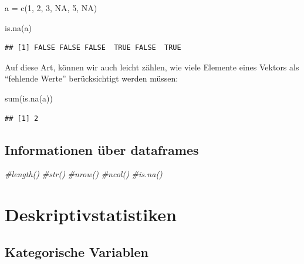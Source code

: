 \documentclass[
]{book}
\newenvironment{Shaded}{\begin{snugshade}}{\end{snugshade}}
\newcommand{\CommentTok}[1]{\textcolor[rgb]{0.56,0.35,0.01}{\textit{#1}}}
\newcommand{\ConstantTok}[1]{\textcolor[rgb]{0.00,0.00,0.00}{#1}}
\newcommand{\DecValTok}[1]{\textcolor[rgb]{0.00,0.00,0.81}{#1}}
\newcommand{\FunctionTok}[1]{\textcolor[rgb]{0.00,0.00,0.00}{#1}}
\newcommand{\NormalTok}[1]{#1}
\newcommand{\OtherTok}[1]{\textcolor[rgb]{0.56,0.35,0.01}{#1}}
\begin{document}
\begin{Shaded}
\begin{Highlighting}[]
\NormalTok{a }\OtherTok{=} \FunctionTok{c}\NormalTok{(}\DecValTok{1}\NormalTok{, }\DecValTok{2}\NormalTok{, }\DecValTok{3}\NormalTok{, }\ConstantTok{NA}\NormalTok{, }\DecValTok{5}\NormalTok{, }\ConstantTok{NA}\NormalTok{)}

\FunctionTok{is.na}\NormalTok{(a)}
\end{Highlighting}
\end{Shaded}

\begin{verbatim}
## [1] FALSE FALSE FALSE  TRUE FALSE  TRUE
\end{verbatim}

Auf diese Art, können wir auch leicht zählen, wie viele Elemente eines Vektors als ``fehlende Werte'' berücksichtigt werden müssen:

\begin{Shaded}
\begin{Highlighting}[]
\FunctionTok{sum}\NormalTok{(}\FunctionTok{is.na}\NormalTok{(a))}
\end{Highlighting}
\end{Shaded}

\begin{verbatim}
## [1] 2
\end{verbatim}

\hypertarget{informationen-uxfcber-dataframes}{%
\subsection{Informationen über dataframes}\label{informationen-uxfcber-dataframes}}

\begin{Shaded}
\begin{Highlighting}[]
\CommentTok{\#length()}
\CommentTok{\#str()}
\CommentTok{\#nrow()}
\CommentTok{\#ncol()}
\CommentTok{\#is.na()}
\end{Highlighting}
\end{Shaded}

\hypertarget{deskriptivstatistiken}{%
\section{Deskriptivstatistiken}\label{deskriptivstatistiken}}

\hypertarget{kategorische-variablen}{%
\subsection{Kategorische Variablen}\label{kategorische-variablen}}
\end{document}
